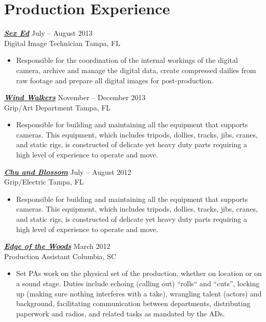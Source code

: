 \section{Production Experience}
  {\textsl \textbf{\href{http://http://www.imdb.com/title/tt2751310}{Sex Ed}}} \hfill July -- August 2013 \\
  Digital Image Technician \hfill Tampa, FL
  \begin{itemize}
  \item
    Responsible for the coordination of the internal workings of the digital camera, archive and manage the digital data, create compressed dailies from raw footage and prepare all digital images for post-production.
  \end{itemize}

  {\textsl \textbf{\href{http://www.imdb.com/title/tt1236254}{Wind Walkers}}} \hfill November -- December 2013 \\
  Grip/Art Department \hfill Tampa, FL
  \begin{itemize}
  \item
    Responsible for building and maintaining all the equipment that supports cameras. This equipment, which includes tripods, dollies, tracks, jibs, cranes, and static rigs, is constructed of delicate yet heavy duty parts requiring a high level of experience to operate and move.
  \end{itemize}

  {\textsl \textbf{\href{http://www.imdb.com/title/tt2339064}{Chu and Blossom}}} \hfill July -- August 2012 \\
  Grip/Electric \hfill Tampa, FL
  \begin{itemize}
  \item
    Responsible for building and maintaining all the equipment that supports cameras. This equipment, which includes tripods, dollies, tracks, jibs, cranes, and static rigs, is constructed of delicate yet heavy duty parts requiring a high level of experience to operate and move.
  \end{itemize}

  {\textsl \textbf{\href{http://www.imdb.com/title/tt3268422}{Edge of the Woods}}} \hfill March 2012 \\
  Production Assistant \hfill Columbia, SC
  \begin{itemize}
  \item
    Set PAs work on the physical set of the production, whether on location or on a sound stage. Duties include echoing (calling out) ``rolls`` and ``cuts'', locking up (making sure nothing interferes with a take), wrangling talent (actors) and background, facilitating communication between departments, distributing paperwork and radios, and related tasks as mandated by the ADs.
  \end{itemize}
